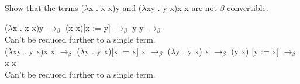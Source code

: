 \documentclass[12pt]{exam}
\begin{document}
\begin{questions}

	\question

	\question

	\question
        Show that the terms ($\lambda$x . x x)y and ($\lambda$xy . y x)x x are not $\beta$-convertible.
        \begin{solution}
        
            ($\lambda$x . x x)y $\rightarrow_{\beta}$ (x x)[x := y] $\rightarrow_{\beta}$ y y $\rightarrow_{\beta}$ \\
            Can't be reduced further to a single term.\\
            ($\lambda$xy . y x)x x $\rightarrow_{\beta}$ ($\lambda$y . y x)[x := x] x $\rightarrow_{\beta}$ ($\lambda$y . y x) x  $\rightarrow_{\beta}$ (y x) [y := x] $\rightarrow_{\beta}$ x x\\
            Can't be reduced further to a single term.
            
        \end{solution}

	\question

	\question

	\question

	\question

	\question

	\question

	\question

	\question

	\question

	\question

	\question

	\question

\end{questions}
\end{document}
